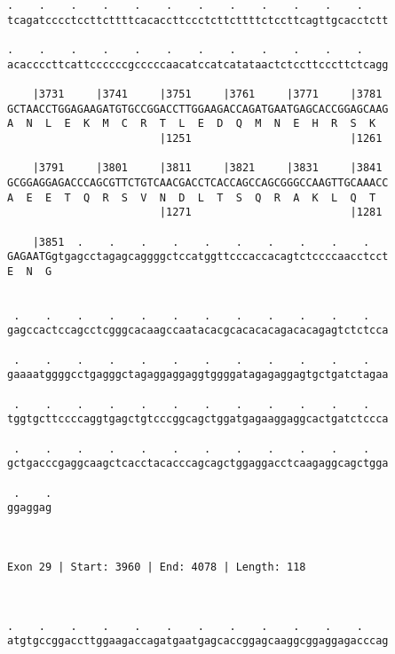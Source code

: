 \documentclass{article}
\begin{document}
\begin{Verbatim}
.    .    .    .    .    .    .    .    .    .    .    .    
tcagatcccctccttcttttcacaccttccctcttcttttctccttcagttgcacctctt
                                                            
.    .    .    .    .    .    .    .    .    .    .    .    
acaccccttcattccccccgcccccaacatccatcatataactctccttcccttctcagg
                                                            
    |3731     |3741     |3751     |3761     |3771     |3781 
GCTAACCTGGAGAAGATGTGCCGGACCTTGGAAGACCAGATGAATGAGCACCGGAGCAAG
A  N  L  E  K  M  C  R  T  L  E  D  Q  M  N  E  H  R  S  K  
                        |1251                         |1261 
  
    |3791     |3801     |3811     |3821     |3831     |3841 
GCGGAGGAGACCCAGCGTTCTGTCAACGACCTCACCAGCCAGCGGGCCAAGTTGCAAACC
A  E  E  T  Q  R  S  V  N  D  L  T  S  Q  R  A  K  L  Q  T  
                        |1271                         |1281 
  
    |3851  .    .    .    .    .    .    .    .    .    .   
GAGAATGgtgagcctagagcaggggctccatggttcccaccacagtctccccaacctcct
E  N  G                                                     
                                                            
  
 .    .    .    .    .    .    .    .    .    .    .    .   
gagccactccagcctcgggcacaagccaatacacgcacacacagacacagagtctctcca
                                                            
 .    .    .    .    .    .    .    .    .    .    .    .   
gaaaatggggcctgagggctagaggaggaggtggggatagagaggagtgctgatctagaa
                                                            
 .    .    .    .    .    .    .    .    .    .    .    .   
tggtgcttccccaggtgagctgtcccggcagctggatgagaaggaggcactgatctccca
                                                            
 .    .    .    .    .    .    .    .    .    .    .    .   
gctgacccgaggcaagctcacctacacccagcagctggaggacctcaagaggcagctgga
                                                            
 .    .
ggaggag
       
       
 
Exon 29 | Start: 3960 | End: 4078 | Length: 118



.    .    .    .    .    .    .    .    .    .    .    .    
atgtgccggaccttggaagaccagatgaatgagcaccggagcaaggcggaggagacccag
                                                            

\end{Verbatim}
\end{document}
